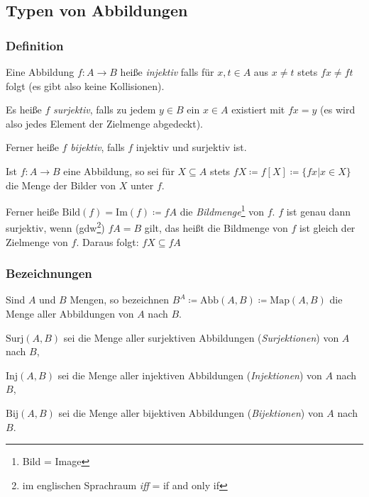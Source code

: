 \subsection{Typen von Abbildungen}\label{kap_typabb}
\subsubsection{Definition}
\begin{description}
\item Eine Abbildung $f \colon A \rightarrow B$ heiße \emph{injektiv} falls für
$x, t \in A$ aus $x \neq t$ stets $fx \neq ft$ folgt (es gibt also keine Kollisionen).
\item Es heiße $f$ \emph{surjektiv}, falls zu jedem $y \in B$ ein $x \in A$
existiert mit $fx = y$ (es wird also jedes Element der Zielmenge abgedeckt).
\item Ferner heiße $f$ \emph{bijektiv}, falls $f$ injektiv und surjektiv ist.
\end{description}
Ist $f \colon A \rightarrow B$ eine Abbildung, so sei für $X \subseteq A$ stets
$fX \coloneq f[X] \coloneq \{fx | x \in X\}$ die Menge der Bilder von $X$ unter
$f$.

Ferner heiße $\text{Bild}(f) = \text{Im}(f) \coloneq fA$ die
\emph{Bildmenge}\footnote{Bild = Image} von $f$. $f$ ist genau dann surjektiv,
wenn (gdw\footnote{im englischen Sprachraum \emph{iff} = if and only if}) $fA = B$
gilt, das heißt die Bildmenge von $f$ ist gleich der Zielmenge von $f$. Daraus
folgt: $fX \subseteq fA$

\subsubsection{Bezeichnungen}
\begin{description}
\item Sind $A$ und $B$ Mengen, so bezeichnen $B^A \coloneq \text{Abb}(A,B)
\coloneq \text{Map}(A,B)$ die Menge aller Abbildungen von $A$ nach $B$.
\item $\text{Surj}(A,B)$ sei die Menge aller surjektiven Abbildungen
(\emph{Surjektionen}) von $A$ nach $B$,
\item $\text{Inj}(A,B)$ sei die Menge aller injektiven Abbildungen
(\emph{Injektionen}) von $A$ nach $B$,
\item $\text{Bij}(A,B)$ sei die Menge aller bijektiven Abbildungen
(\emph{Bijektionen}) von $A$ nach $B$.
\end{description}

\begin{figure}
\hfill
{}\hfill
{}\hfill
{}
\end{figure}